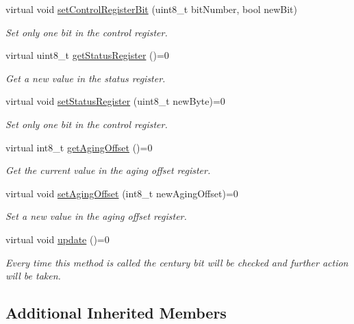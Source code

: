 \begin{DoxyCompactItemize}
virtual void \mbox{\hyperlink{classreal_time_clock_af9b7db85f78d01060772bdb3b397ea3c}{set\+Control\+Register\+Bit}} (uint8\+\_\+t bit\+Number, bool new\+Bit)
\begin{DoxyCompactList}\small\item\em Set only one bit in the control register. \end{DoxyCompactList}\item 
virtual uint8\+\_\+t \mbox{\hyperlink{classreal_time_clock_a38dcc51b0b30a5e480ea7f18f2c792ba}{get\+Status\+Register}} ()=0
\begin{DoxyCompactList}\small\item\em Get a new value in the status register. \end{DoxyCompactList}\item 
virtual void \mbox{\hyperlink{classreal_time_clock_aa8ee80a7056c67543834508d0f04a218}{set\+Status\+Register}} (uint8\+\_\+t new\+Byte)=0
\begin{DoxyCompactList}\small\item\em Set only one bit in the control register. \end{DoxyCompactList}\item 
virtual int8\+\_\+t \mbox{\hyperlink{classreal_time_clock_a2bc081385a6ad8273201d66217f8b2f0}{get\+Aging\+Offset}} ()=0
\begin{DoxyCompactList}\small\item\em Get the current value in the aging offset register. \end{DoxyCompactList}\item 
virtual void \mbox{\hyperlink{classreal_time_clock_aacf97da86677ee3fb55b5180ba5c0727}{set\+Aging\+Offset}} (int8\+\_\+t new\+Aging\+Offset)=0
\begin{DoxyCompactList}\small\item\em Set a new value in the aging offset register. \end{DoxyCompactList}\item 
virtual void \mbox{\hyperlink{classreal_time_clock_afb5132ca3cbe80552a88041cead0a2b3}{update}} ()=0
\begin{DoxyCompactList}\small\item\em Every time this method is called the century bit will be checked and further action will be taken. \end{DoxyCompactList}\end{DoxyCompactItemize}
\subsection*{Additional Inherited Members}


